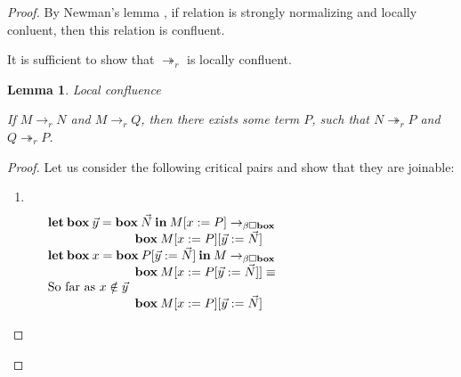 \documentclass[a4paper]{article}
\newtheorem{lemma}{Lemma}
\begin{document}
\begin{proof}

  By Newman's lemma \cite{Morten}, if relation is strongly normalizing and locally conluent, then this relation is confluent.

It is sufficient to show that $\twoheadrightarrow_r$ is locally confluent.

\begin{lemma} Local confluence

If $M \rightarrow_{r} N$ and $M \rightarrow_{r} Q$, then there exists some term $P$,
such that $N \twoheadrightarrow_{r} P$ and $Q \twoheadrightarrow_{r} P$.

\end{lemma}

\begin{proof}

Let us consider the following critical pairs and show that they are joinable:

\begin{enumerate}
\item $ $ \\


\vspace{\baselineskip}

$\begin{array}{lll}
&{\bf let \: box \:} \vec{y} = {\bf box \:} \vec{N} {\: \bf in \:} M [x := P] \rightarrow_{\beta \Box {\bf box}}& \\
&\quad\quad\quad\quad\quad\quad\quad {\bf box \:} M [x := P] [\vec{y} := \vec{N}]& \\
&{\bf let \: box \:} x = {\bf box \:} P [\vec{y} := \vec{N}] {\: \bf in \:} M \rightarrow_{\beta \Box {\bf box}}& \\
&\quad\quad\quad\quad\quad\quad\quad {\bf box \:} M [x := P[\vec{y} := \vec{N}]] \equiv & \\
&\text{So far as $x \notin \vec{y}$}& \\
&\quad\quad\quad\quad\quad\quad\quad {\bf box \:} M [x := P] [\vec{y} := \vec{N}] & \\
\end{array}$


\end{enumerate}
\end{proof}
\end{proof}
\end{document}

